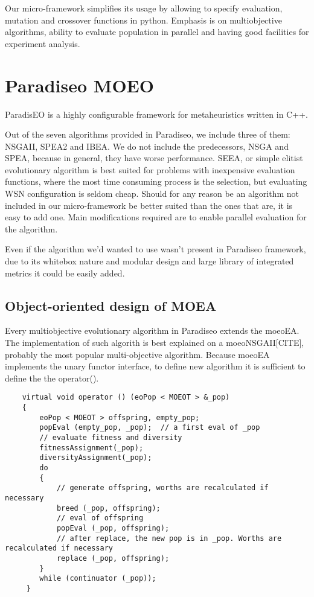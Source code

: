 \documentclass[12pt,oneside,draft]{fithesis2}
\begin{document}
Our micro-framework simplifies its usage by allowing to specify evaluation, mutation and crossover functions in python. Emphasis is on multiobjective algorithms, ability to evaluate population in parallel and having good facilities for experiment analysis.

\section{Paradiseo MOEO}
ParadisEO is a highly configurable framework for metaheuristics written in C++. 

Out of the seven algorithms provided in Paradiseo, we include three of them: NSGAII, SPEA2 and IBEA. We do not include the predecessors, NSGA and SPEA, because in general, they have worse performance. SEEA, or simple elitist evolutionary algorithm is best suited for problems with inexpensive evaluation functions, where the most time consuming process is the selection, but evaluating WSN configuration is seldom cheap. Should for any reason be an algorithm not included in our micro-framework be better suited than the ones that are, it is easy to add one. Main modifications required are to enable parallel evaluation for the algorithm.

Even if the algorithm we'd wanted to use wasn't present in Paradiseo framework, due to its whitebox nature and modular design and large library of integrated metrics it could be easily added.

\subsection{Object-oriented design of MOEA}

Every multiobjective evolutionary algorithm in Paradiseo extends the moeoEA. 
The implementation of such algorith is best explained on a  moeoNSGAII[CITE], probably the most popular multi-objective algorithm. 
Because moeoEA implements the unary functor interface, to define new algorithm it is sufficient to define the the operator().

\begin{lstlisting}
    virtual void operator () (eoPop < MOEOT > &_pop)
    {
        eoPop < MOEOT > offspring, empty_pop;
        popEval (empty_pop, _pop);	// a first eval of _pop
        // evaluate fitness and diversity
        fitnessAssignment(_pop);
        diversityAssignment(_pop);
        do
        {
            // generate offspring, worths are recalculated if necessary
            breed (_pop, offspring);
            // eval of offspring
            popEval (_pop, offspring);
            // after replace, the new pop is in _pop. Worths are recalculated if necessary
            replace (_pop, offspring);
        }
        while (continuator (_pop));
     }
\end{lstlisting}
\end{document}

